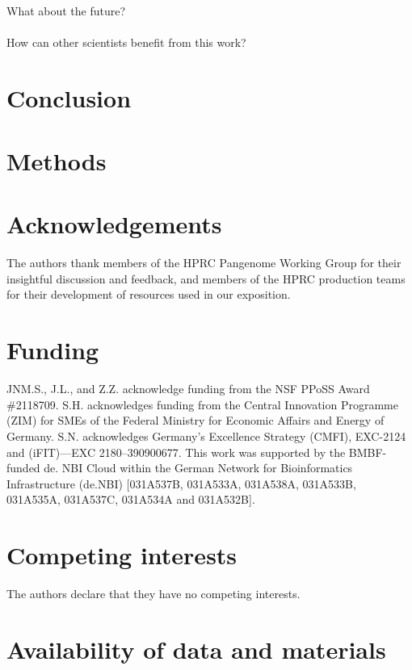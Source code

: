 \documentclass[11pt,hidelinks]{article}
\begin{document}
\paragraph{}
What about the future?
\paragraph{}
How can other scientists benefit from this work?
\section{Conclusion}

\section{Methods}




\section*{Acknowledgements}
The authors thank members of the HPRC Pangenome Working Group for their insightful discussion and feedback, and members of the HPRC production teams for their development of resources used in our exposition.

\section*{Funding}
JNM.S., J.L., and Z.Z. acknowledge funding from the NSF PPoSS Award \#2118709.
S.H. acknowledges funding from the Central Innovation Programme (ZIM) for SMEs of the Federal Ministry for Economic Affairs and Energy of Germany. S.N. acknowledges Germany’s Excellence Strategy (CMFI), EXC-2124 and (iFIT)—EXC 2180–390900677. This work was supported by the BMBF-funded de. NBI Cloud within the German Network for Bioinformatics Infrastructure (de.NBI) [031A537B, 031A533A, 031A538A, 031A533B, 031A535A, 031A537C, 031A534A and 031A532B].

\section*{Competing interests}
The authors declare that they have no competing interests.

\section*{Availability of data and materials}
\end{document}
